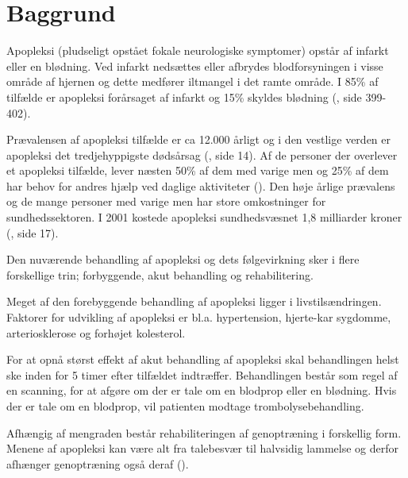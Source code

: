 \chapter{Baggrund} \label{chap:Baggrund}

Apopleksi (pludseligt opstået fokale neurologiske symptomer) opstår af infarkt eller en blødning. Ved infarkt nedsættes eller afbrydes blodforsyningen i visse område af hjernen og dette medfører iltmangel i det ramte område. I 85\% af tilfælde er apopleksi forårsaget af infarkt og 15\% skyldes blødning (\cite{RefWorks:32}, side 399-402).

Prævalensen af apopleksi tilfælde er ca 12.000 årligt og i den vestlige verden er apopleksi det tredjehyppigste dødsårsag (\cite{RefWorks:21}, side 14). Af de personer der overlever et apopleksi tilfælde, lever næsten 50\% af dem med varige men og 25\% af dem har behov for andres hjælp ved daglige aktiviteter (\cite{RefWorks:33}). Den høje årlige prævalens og de mange personer med varige men har store omkostninger for sundhedssektoren.  I 2001 kostede apopleksi sundhedsvæsnet 1,8 milliarder kroner (\cite{RefWorks:37}, side 17). 

Den nuværende behandling af apopleksi og dets følgevirkning sker i flere forskellige trin; forbyggende, akut behandling og rehabilitering. 

Meget af den forebyggende behandling af apopleksi ligger i livstilsændringen. Faktorer for udvikling af apopleksi er bl.a. hypertension, hjerte-kar sygdomme, arteriosklerose og forhøjet kolesterol. 

For at opnå størst effekt af akut behandling af apopleksi skal behandlingen helst ske inden for 5 timer efter tilfældet indtræffer. Behandlingen består som regel af en scanning, for at afgøre om der er tale om en blodprop eller en blødning. Hvis der er tale om en blodprop, vil patienten modtage trombolysebehandling.

Afhængig af mengraden består rehabiliteringen af genoptræning i forskellig form. Menene af apopleksi kan være alt fra talebesvær til halvsidig lammelse og derfor afhænger genoptræning også deraf (\cite{RefWorks:34}).

